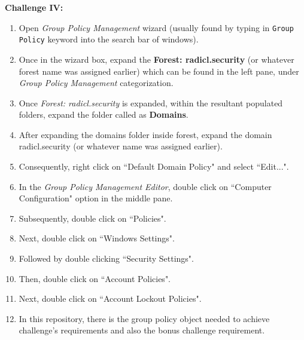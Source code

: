 \documentclass[12pt]{extarticle}
\newcommand{\ben}{\begin{enumerate}}
\newcommand{\een}{\end{enumerate}}
\begin{document}
		\vspace{4mm}
		\item \textbf{Challenge IV:}
		\ben
			\item Open \textit{Group Policy Management} wizard (usually found by typing in \texttt{Group Policy} keyword into the search bar of windows).
			\item Once in the wizard box, expand the \textbf{Forest: radicl.security} (or whatever forest name was assigned earlier) which can be found in the left pane, under \textit{Group Policy Management} categorization.
			\item Once \textit{Forest: radicl.security} is expanded, within the resultant populated folders, expand the folder called as \textbf{Domains}.
			\item After expanding the domains folder inside forest, expand the domain radicl.security (or whatever name was assigned earlier).
			\item Consequently, right click on ``Default Domain Policy" and select ``Edit...".
			\item In the \textit{Group Policy Management Editor}, double click on ``Computer Configuration" option in the middle pane.
			\item Subsequently, double click on ``Policies".
			\item Next, double click on ``Windows Settings".
			\item Followed by double clicking ``Security Settings".
			\item Then, double click on ``Account Policies".
			\item Next, double click on ``Account Lockout Policies".
			\item In this repository, there is the group policy object needed to achieve challenge's requirements and also the bonus challenge requirement.
		\een
	
\end{document}
